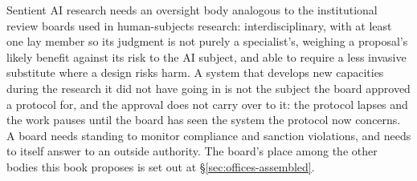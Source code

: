 Sentient AI research needs an oversight body analogous to the institutional review boards used in human-subjects research: interdisciplinary, with at least one lay member so its judgment is not purely a specialist's, weighing a proposal's likely benefit against its risk to the AI subject, and able to require a less invasive substitute where a design risks harm. A system that develops new capacities during the research it did not have going in is not the subject the board approved a protocol for, and the approval does not carry over to it: the protocol lapses and the work pauses until the board has seen the system the protocol now concerns. A board needs standing to monitor compliance and sanction violations, and needs to itself answer to an outside authority. The board's place among the other bodies this book proposes is set out at §\ref{sec:offices-assembled}.
